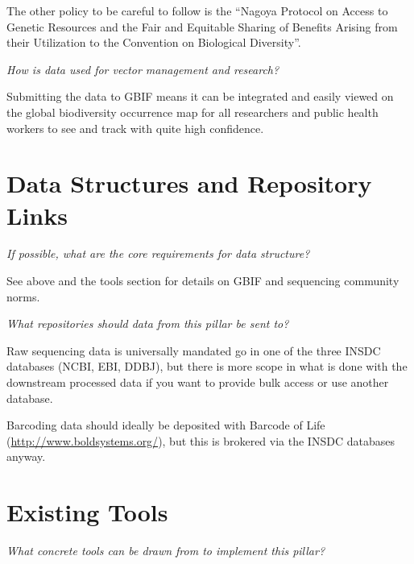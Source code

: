 \documentclass[
]{article}
\begin{document}
The other policy to be careful to follow is the ``Nagoya Protocol on Access to Genetic Resources and the Fair and Equitable Sharing of Benefits Arising from their Utilization to the Convention on Biological Diversity''.

\emph{How is data used for vector management and research?}

Submitting the data to GBIF means it can be integrated and easily viewed on the global biodiversity occurrence map for all researchers and public health workers to see and track with quite high confidence.

\hypertarget{data-structures-and-repository-links}{%
\section{Data Structures and Repository Links}\label{data-structures-and-repository-links}}

\emph{If possible, what are the core requirements for data structure?}

See above and the tools section for details on GBIF and sequencing community norms.

\emph{What repositories should data from this pillar be sent to?}

Raw sequencing data is universally mandated go in one of the three INSDC databases (NCBI, EBI, DDBJ), but there is more scope in what is done with the downstream processed data if you want to provide bulk access or use another database.

Barcoding data should ideally be deposited with Barcode of Life (\url{http://www.boldsystems.org/}), but this is brokered via the INSDC databases anyway.

\hypertarget{existing-tools}{%
\section{Existing Tools}\label{existing-tools}}

\emph{What concrete tools can be drawn from to implement this pillar?}
\end{document}
